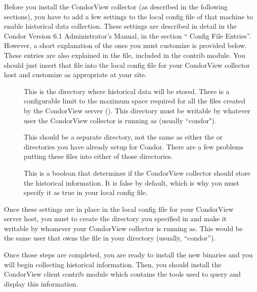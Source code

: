 Before you install the CondorView collector (as described in the
following sections), you have to add a few settings to the local
config file of that machine to enable historical data collection.
These settings are described in detail in the Condor Version 6.1
Administrator's Manual, in the section `` Config File
Entries''.
However, a short explanation of the ones you must customize is
provided below. 
These entries are also explained in the
 file, included
in the contrib module.
You should just insert that file into the local config file for your
CondorView collector host and customize as appropriate at your site.  
\begin{description}

\item[] This is the directory where
historical data will be stored.
There is a configurable limit to the maximum space required for all
the files created by the CondorView server
(). 
This directory must be writable by whatever user the CondorView
collector is running as (usually ``condor").  

\Note This should be a separate directory, not the same as either the
 or  directories you have already setup for
Condor. 
There are a few problems putting these files into either of those
directories.

\item[] This is a boolean that determines
if the CondorView collector should store the historical information.
It is false by default, which is why you must specify it as true in
your local config file.

\end{description}

Once these settings are in place in the local config file for your
CondorView server host, you must to create the directory you specified
in  and make it writable by whomever your
CondorView collector is running as.
This would be the same user that owns the  file in
your  directory (usually, ``condor'').

Once those steps are completed, you are ready to install the new
binaries and you will begin collecting historical information.
Then, you should install the CondorView client contrib module which
contains the tools used to query and display this information.

